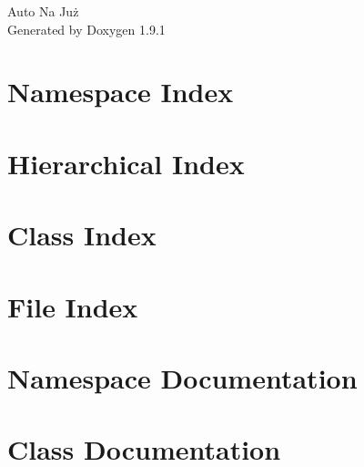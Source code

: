 \let\mypdfximage\pdfximage\def\pdfximage{\immediate\mypdfximage}\documentclass[twoside]{book}
\newcommand{\+}{\discretionary{\mbox{\scriptsize$\hookleftarrow$}}{}{}}
\newcommand{\clearemptydoublepage}{%
  \newpage{\pagestyle{empty}\cleardoublepage}%
}
\begin{document}
\raggedbottom

\hypersetup{pageanchor=false,
             bookmarksnumbered=true,
             pdfencoding=unicode
            }
\begin{titlepage}
\vspace*{7cm}
\begin{center}%
{\Large Auto Na Już }\\
\vspace*{1cm}
{\large Generated by Doxygen 1.9.1}\\
\end{center}
\end{titlepage}
\clearemptydoublepage
{}
\tableofcontents
\clearemptydoublepage
{}
\hypersetup{pageanchor=true}

\chapter{Namespace Index}

\chapter{Hierarchical Index}

\chapter{Class Index}

\chapter{File Index}

\chapter{Namespace Documentation}











\chapter{Class Documentation}













\end{document}
